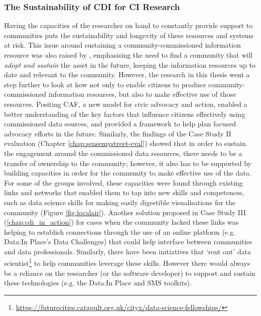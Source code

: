 \subsubsection{The Sustainability of CDI for CI Research}
Having the capacities of the researcher on hand to constantly provide support to communities puts the sustainability and longevity of these resources and systems at risk. This issue around sustaining a community-commissioned information resource was also raised by \citet{garbett_designing_2017}, emphasising the need to find a community that will \textit{adopt and sustain} the asset in the future, keeping the information resources up to date and relevant to the community. However, the research in this thesis went a step further to look at how not only to enable citizens to produce community-commissioned information resources, but also to make effective use of those resources. Positing CAF, a new model for civic advocacy and action, enabled a better understanding of the key factors that influence citizens effectively using commissioned data sources, and provided a framework to help plan focused advocacy efforts in the future. Similarly, the findings of the Case Study II evaluation (Chapter \ref{chap:sensemystreet-eval}) showed that in order to sustain the engagement around the commissioned data resources, there needs to be a transfer of ownership to the community; however, it also has to be supported by building capacities in order for the community to make effective use of the data. For some of the groups involved, these capacities were found through existing links and networks that enabled them to tap into new skills and competences, such as data science skills for making easily digestible visualisations for the community (Figure \ref{fig:localair}). Another solution proposed in Case Study III (\ref{chap:cdi_in_action}) for cases when the community lacked these links was helping to establish connections through the use of an online platform (e.g. Data:In Place's Data Challenges) that could help interface between communities and data professionals. Similarly, there have been initiatives that `rent out' data scientist\footnote{\url{https://futurecities.catapult.org.uk/cityx/data-science-fellowships/}} to help communities leverage these skills. However there would always be a reliance on the researcher (or the software developer) to support and sustain these technologies (e.g. the Data:In Place and SMS toolkits).

